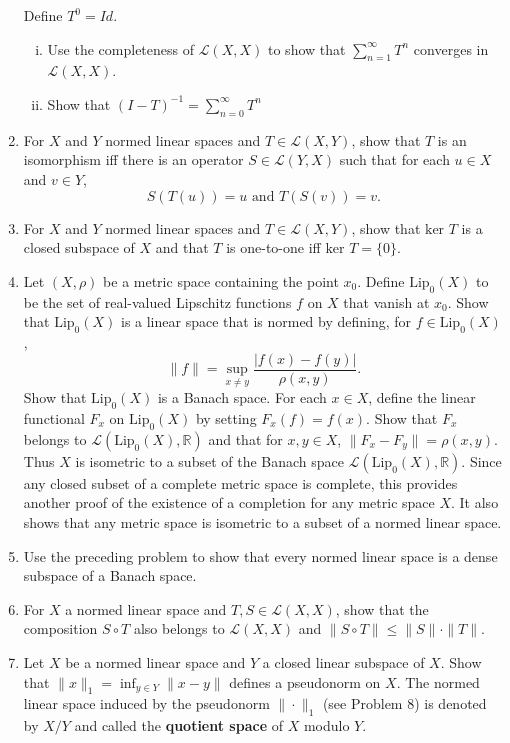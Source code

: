 \begin{enumerate}
    Define $T^0=Id$.
    \begin{enumerate}[(i)]
        \item Use the completeness of $\mathcal{L}(X,X)$ to show that $\sum_{n=1}^\infty T^n$ converges in $\mathcal{L}(X,X)$.
        \item Show that $(I-T)^{-1}=\sum_{n=0}^\infty T^n$
    \end{enumerate}
    \item For $X$ and $Y$ normed linear spaces and $T\in\mathcal{L}(X,Y)$, show that $T$ is an isomorphism iff there is an operator $S\in\mathcal{L}(Y,X)$ such that for each $u\in X$ and $v\in Y$,
    \[
        S(T(u))=u\text{ and }T(S(v))=v.
    \]
    \item For $X$ and $Y$ normed linear spaces and $T\in\mathcal{L}(X,Y)$, show that $\text{ker }T$ is a closed subspace of $X$ and that $T$ is one-to-one iff $\text{ker }T=\{0\}$.
    \item Let $(X,\rho)$ be a metric space containing the point $x_0$.
    Define $\text{Lip}_0(X)$ to be the set of real-valued Lipschitz functions $f$ on $X$ that vanish at $x_0$.
    Show that $\text{Lip}_0(X)$ is a linear space that is normed by defining, for $f\in\text{Lip}_0(X)$,
    \[
        \|f\|=\sup_{x\neq y}\frac{|f(x)-f(y)|}{\rho(x,y)}.
    \]
    Show that $\text{Lip}_0(X)$ is a Banach space.
    For each $x\in X$, define the linear functional $F_x$ on $\text{Lip}_0(X)$ by setting $F_x(f)=f(x)$.
    Show that $F_x$ belongs to $\mathcal{L}(\text{Lip}_0(X),\mathbb{R})$ and that for $x,y\in X$, $\|F_x-F_y\|=\rho(x,y)$.
    Thus $X$ is isometric to a subset of the Banach space $\mathcal{L}(\text{Lip}_0(X),\mathbb{R})$.
    Since any closed subset of a complete metric space is complete, this provides another proof of the existence of a completion for any metric space $X$.
    It also shows that any metric space is isometric to a subset of a normed linear space.
    \item Use the preceding problem to show that every normed linear space is a dense subspace of a Banach space.
    \item For $X$ a normed linear space and $T,S\in\mathcal{L}(X,X)$, show that the composition $S\circ T$ also belongs to $\mathcal{L}(X,X)$ and $\|S\circ T\|\le\|S\|\cdot\|T\|$.
    \item Let $X$ be a normed linear space and $Y$ a closed linear subspace of $X$.
    Show that $\|x\|_1=\inf_{y\in Y}\|x-y\|$ defines a pseudonorm on $X$.
    The normed linear space induced by the pseudonorm $\|\cdot\|_1$ (see Problem 8) is denoted by $X/Y$ and called the \textbf{quotient space} of $X$ modulo $Y$.

\end{enumerate}
